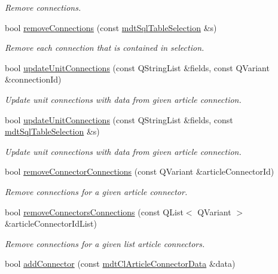 \begin{DoxyCompactItemize}
\begin{DoxyCompactList}\small\item\em Remove connections. \end{DoxyCompactList}\item 
bool \hyperlink{classmdt_cl_article_a672b0f8b26a926ab136e3c066bdab43b}{remove\-Connections} (const \hyperlink{classmdt_sql_table_selection}{mdt\-Sql\-Table\-Selection} \&s)
\begin{DoxyCompactList}\small\item\em Remove each connection that is contained in selection. \end{DoxyCompactList}\item 
bool \hyperlink{classmdt_cl_article_a3e4e0928978f3b3c0b2b39ba00eb80d1}{update\-Unit\-Connections} (const Q\-String\-List \&fields, const Q\-Variant \&connection\-Id)
\begin{DoxyCompactList}\small\item\em Update unit connections with data from given article connection. \end{DoxyCompactList}\item 
bool \hyperlink{classmdt_cl_article_af1ae773db17c68465b4a75d6f93ec418}{update\-Unit\-Connections} (const Q\-String\-List \&fields, const \hyperlink{classmdt_sql_table_selection}{mdt\-Sql\-Table\-Selection} \&s)
\begin{DoxyCompactList}\small\item\em Update unit connections with data from given article connection. \end{DoxyCompactList}\item 
bool \hyperlink{classmdt_cl_article_ac9704a413087d1d0e8f2dd51c33bd74e}{remove\-Connector\-Connections} (const Q\-Variant \&article\-Connector\-Id)
\begin{DoxyCompactList}\small\item\em Remove connections for a given article connector. \end{DoxyCompactList}\item 
bool \hyperlink{classmdt_cl_article_af9e67178a6028549a1b8167efafe6544}{remove\-Connectors\-Connections} (const Q\-List$<$ Q\-Variant $>$ \&article\-Connector\-Id\-List)
\begin{DoxyCompactList}\small\item\em Remove connections for a given list article connectors. \end{DoxyCompactList}\item 
bool \hyperlink{classmdt_cl_article_a2e30c08621a8cc73bc4f6c041189f9ab}{add\-Connector} (const \hyperlink{classmdt_cl_article_connector_data}{mdt\-Cl\-Article\-Connector\-Data} \&data)

\end{DoxyCompactItemize}
